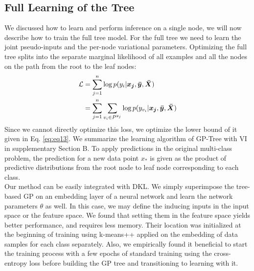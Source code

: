 \documentclass[preprint,11pt]{elsarticle}
\begin{document}
        \subsection{Full Learning of the Tree}
        \label{sec:3.3}
        We discussed how to learn and perform inference on a single
        node, we will now describe how to train the full tree model.
        For the full tree we need to learn the joint pseudo-inputs and
        the per-node variational parameters. Optimizing the full tree
        splits into the separate marginal likelihood of all examples
        and all the nodes on the path from the root to the leaf nodes:
        \begin{equation}
        \label{eq:eq15}
            \begin{aligned}
            \mathcal{L} &= \sum_{j=1}^n \log p( y_i|\bm{x_j},\bm{\Bar{y}},\bm{\Bar{X}} )\\
            &= \sum_{j=1}^n \sum_{v_i \in P^{y_j}} \log p( y_{v_i}|\bm{x_j},\bm{\Bar{y}},\bm{\Bar{X}} )
            \end{aligned}
        \end{equation}
        Since we cannot directly optimize this loss, we optimize
    the lower bound of it given in Eq. \ref{eq:eq13}. We summarize the
    learning algorithm of GP-Tree with VI in supplementary
    Section B. To apply predictions in the original multi-class
    problem, the prediction for a new data point $x_*$ is given as
    the product of predictive distributions from the root node to
    leaf node corresponding to each class.
    \\
    Our method can be easily integrated with DKL. We simply
    superimpose the tree-based GP on an embedding layer of a
    neural network and learn the network parameters $\theta$ as well.
    In this case, we may define the inducing inputs in the input
    space or the feature space. We found that setting them in
    the feature space yields better performance, and requires
    less memory. Their location was initialized at the beginning
    of training using k-means++ applied on the embedding of
    data samples for each class separately. Also, we empirically
    found it beneficial to start the training process with a few
    epochs of standard training using the cross-entropy loss before building the GP tree and transitioning to learning
    with it.
\end{document}
